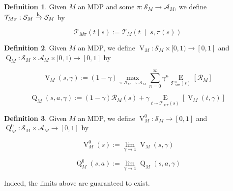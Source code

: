 \documentclass[11pt]{article}
\theoremstyle{definition}
\newtheorem{definition}{Definition}%
\theoremstyle{plain}
\newcommand{\AB}[1]{\left[#1\right]}
\newcommand{\APM}[2]{\left(#1\;\middle\vert\;#2\right)}
\newcommand{\Ea}[2]{\underset{#1}{\operatorname{E}}\AB{#2}}
\newcommand{\K}{\xrightarrow{\textnormal{k}}}
\newcommand{\A}{\mathcal{A}}
\newcommand{\St}{\mathcal{S}}
\newcommand{\T}{\mathcal{T}}
\newcommand{\R}{\mathcal{R}}
\newcommand{\V}{\operatorname{V}}
\newcommand{\Q}{\operatorname{Q}}
\begin{document}
\begin{samepage}
\begin{definition}

Given $M$ an MDP and some $\pi: \St_M \rightarrow \A_M$, we define $\T_{M\pi}: \St_M \K \St_M$ by

\begin{equation}
\T_{M\pi}(t \mid s) := \T_M\APM{t}{s,\pi(s)}
\end{equation}

\end{definition}
\end{samepage}

\begin{samepage}
\begin{definition}

Given $M$ an MDP, we define $\V_M : \St_M \times [0,1) \rightarrow [0,1]$ and $\Q_M: \St_M \times \A_M \times [0,1) \rightarrow [0,1]$ by

\begin{equation}
\V_M(s,\gamma):=(1-\gamma) \max_{\pi: \St_M \rightarrow \A_M} \sum_{n=0}^\infty \gamma^n \Ea{\T_{M\pi}^n(s)}{\R_M}
\end{equation}

\begin{equation}
\Q_M(s,a,\gamma):=(1-\gamma)\R_M(s)+\gamma\Ea{t \sim \T_{M\pi}(s)}{\V_M(t,\gamma)}
\end{equation}

\end{definition}
\end{samepage}

\begin{samepage}
\begin{definition}

Given $M$ an MDP, we define $\V^0_M : \St_M \rightarrow [0,1]$ and $\Q^0_M: \St_M \times \A_M \rightarrow [0,1]$ by

\begin{equation}
\V_M^0(s) := \lim_{\gamma \rightarrow 1} \V_M(s,\gamma)
\end{equation}

\begin{equation}
\Q_M^0(s,a) := \lim_{\gamma \rightarrow 1} \Q_M(s,a,\gamma)
\end{equation}

Indeed, the limits above are guaranteed to exist.

\end{definition}
\end{samepage}
\end{document}

